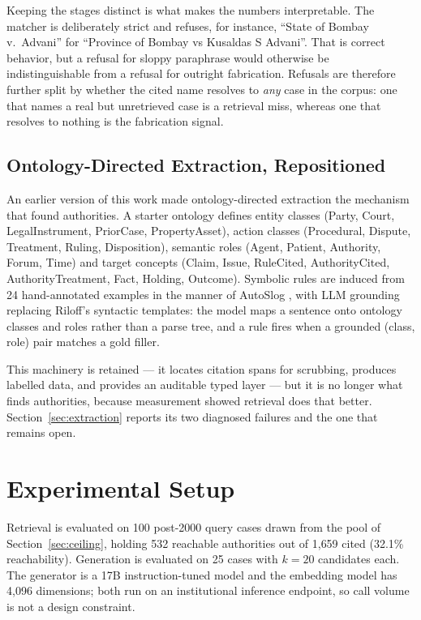 \documentclass[10pt,conference]{IEEEtran}
\begin{document}
Keeping the stages distinct is what makes the numbers interpretable. The matcher is
deliberately strict and refuses, for instance, ``State of Bombay v.\ Advani'' for ``Province
of Bombay vs Kusaldas S Advani''. That is correct behavior, but a refusal for sloppy
paraphrase would otherwise be indistinguishable from a refusal for outright fabrication.
Refusals are therefore further split by whether the cited name resolves to \emph{any} case in
the corpus: one that names a real but unretrieved case is a retrieval miss, whereas one that
resolves to nothing is the fabrication signal.

\subsection{Ontology-Directed Extraction, Repositioned}

An earlier version of this work made ontology-directed extraction the mechanism that found
authorities. A starter ontology defines entity classes (Party, Court, LegalInstrument,
PriorCase, PropertyAsset), action classes (Procedural, Dispute, Treatment, Ruling,
Disposition), semantic roles (Agent, Patient, Authority, Forum, Time) and target concepts
(Claim, Issue, RuleCited, AuthorityCited, AuthorityTreatment, Fact, Holding, Outcome).
Symbolic rules are induced from 24 hand-annotated examples in the manner of AutoSlog
\cite{riloff1993}, with LLM grounding replacing Riloff's syntactic templates: the model maps
a sentence onto ontology classes and roles rather than a parse tree, and a rule fires when a
grounded (class, role) pair matches a gold filler.

This machinery is retained --- it locates citation spans for scrubbing, produces labelled
data, and provides an auditable typed layer --- but it is no longer what finds authorities,
because measurement showed retrieval does that better. Section~\ref{sec:extraction} reports
its two diagnosed failures and the one that remains open.

\section{Experimental Setup}
\label{sec:setup}

Retrieval is evaluated on 100 post-2000 query cases drawn from the pool of
Section~\ref{sec:ceiling}, holding 532 reachable authorities out of 1{,}659 cited
(32.1\% reachability). Generation is evaluated on 25 cases with $k{=}20$ candidates each.
The generator is a 17B instruction-tuned model and the embedding model has 4{,}096
dimensions; both run on an institutional inference endpoint, so call volume is not a design
constraint.
\end{document}
